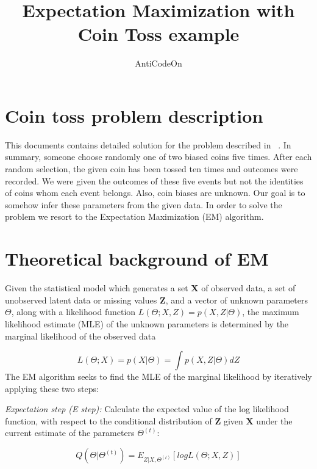 \documentclass[11pt]{article}
\begin{document}
\title{Expectation Maximization with Coin Toss example}
\author{AntiCodeOn}
\maketitle
\section{Coin toss problem description}
This documents contains detailed solution for the problem described in ~\cite{nature}. In summary, someone choose randomly one of two biased coins five times. After each random selection, the given coin has been tossed ten times and outcomes were recorded. We were given the outcomes of these five events but not the identities of coins whom each event belongs. Also, coin biases are unknown. Our goal is to somehow infer these parameters from the given data. In order to solve the problem we resort to the Expectation Maximization (EM) algorithm. 

\section{Theoretical background of EM}

Given the statistical model which generates a set \textbf{X} of observed data, a set of unobserved latent data or missing values \textbf{Z}, and a vector of unknown parameters \textbf{$\Theta$}, along with a likelihood function \boldmath$\textit{L}(\Theta;X,Z) = \textit{p}(X,Z|\Theta)$,
the maximum likelihood estimate (MLE) of the unknown parameters is determined by the marginal likelihood of the observed data

\begin{equation}
\textit{L}(\Theta;X)=\textit{p}(X|\Theta)=\int\textit{p}(X,Z|\Theta)\textit{d}Z
\end{equation}
The EM algorithm seeks to find the MLE of the marginal likelihood by iteratively applying these two steps:

\textit{Expectation step (E step):} Calculate the expected value of the log likelihood function, with respect to the conditional distribution of \textbf{Z} given \textbf{X} under the current estimate of the parameters $\Theta^{(t)}$:

\begin{equation}
Q(\Theta|\Theta^{(t)})=E_{Z|X,\Theta^{(t)}}[log\textit{L}(\Theta;X,Z)]    
\end{equation}
\end{document}
